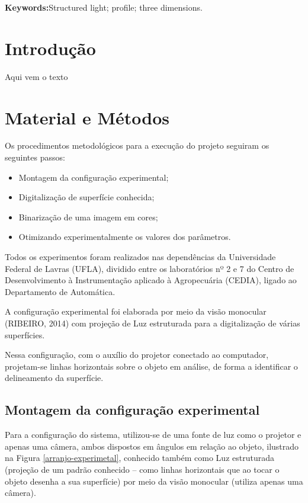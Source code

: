 \documentclass[a4paper, 12pt]{article}
\begin{document}
\textbf{Keywords:}Structured light; profile; three dimensions. 



\section{Introdução}

Aqui vem o texto



\section{Material e Métodos}

Os procedimentos metodológicos para a execução do projeto seguiram os seguintes passos:

\begin{itemize}
\item Montagem da configuração experimental;

\item Digitalização de superfície conhecida;

\item Binarização de uma imagem em cores;

\item Otimizando experimentalmente os valores dos parâmetros. 
\end{itemize}

Todos os experimentos foram realizados nas dependências da Universidade Federal de Lavras (UFLA), dividido entre os laboratórios nº 2 e 7 do Centro de Desenvolvimento à Instrumentação aplicado à Agropecuária (CEDIA), ligado ao Departamento de Automática.

A configuração experimental foi elaborada por meio da visão monocular (RIBEIRO, 2014) com projeção de Luz estruturada para a digitalização de várias superfícies.

Nessa configuração, com o auxílio do projetor conectado ao computador, projetam-se linhas horizontais sobre o objeto em análise, de forma a identificar o delineamento da superfície.


\subsection{Montagem da configuração experimental}

Para a configuração do sistema, utilizou-se de uma fonte de luz como o projetor e apenas uma câmera, ambos dispostos em ângulos em relação ao objeto, ilustrado na Figura \ref{arranjo-experimetal}, conhecido também como Luz estruturada (projeção de um padrão conhecido – como linhas horizontais que ao tocar o objeto desenha a sua superfície) por meio da visão monocular (utiliza apenas uma câmera).
\end{document}
